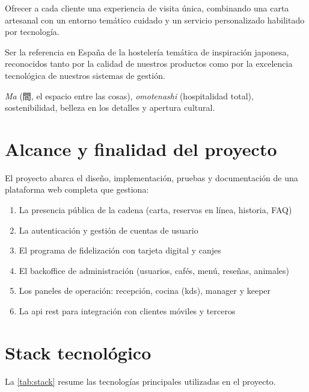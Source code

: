 \documentclass[12pt,a4paper,twoside,openright]{report}
\begin{document}
\begin{description}[style=nextline]
  \item[Misión]
    Ofrecer a cada cliente una experiencia de visita única, combinando una carta
    artesanal con un entorno temático cuidado y un servicio personalizado habilitado
    por tecnología.
  \item[Visión]
    Ser la referencia en España de la hostelería temática de inspiración japonesa,
    reconocidos tanto por la calidad de nuestros productos como por la excelencia
    tecnológica de nuestros sistemas de gestión.
  \item[Valores]
    \textit{Ma} (間, el espacio entre las cosas), \textit{omotenashi} (hospitalidad
    total), sostenibilidad, belleza en los detalles y apertura cultural.
\end{description}

\section{Alcance y finalidad del proyecto}
\label{sec:alcance}

El proyecto abarca el diseño, implementación, pruebas y documentación de una plataforma
web completa que gestiona:

\begin{enumerate}[nosep]
  \item La presencia pública de la cadena (carta, reservas en línea, historia, FAQ)
  \item La autenticación y gestión de cuentas de usuario
  \item El programa de fidelización con tarjeta digital y canjes
  \item El backoffice de administración (usuarios, cafés, menú, reseñas, animales)
  \item Los paneles de operación: recepción, cocina (\gls{kds}), manager y keeper
  \item La \gls{api} \gls{rest} para integración con clientes móviles y terceros
\end{enumerate}

\section{Stack tecnológico}
\label{sec:stack}

La \cref{tab:stack} resume las tecnologías principales utilizadas en el proyecto.
\end{document}
